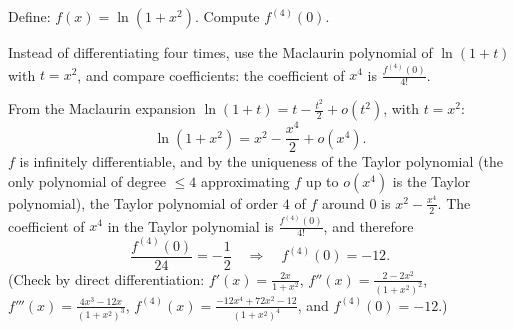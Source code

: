 
\begin{question}
Define: $f(x)=\ln(1+x^2)$. Compute $f^{(4)}(0)$.
\end{question}

\begin{hint}
Instead of differentiating four times, use the Maclaurin polynomial of $\ln(1+t)$ with $t=x^2$, and compare coefficients: the coefficient of $x^4$ is $\frac{f^{(4)}(0)}{4!}$.
\end{hint}

\begin{solution}
From the Maclaurin expansion $\ln(1+t)=t-\frac{t^2}{2}+o(t^2)$, with $t=x^2$:
\[ \ln(1+x^2)=x^2-\frac{x^4}{2}+o(x^4). \]
$f$ is infinitely differentiable, and by the uniqueness of the Taylor polynomial (the only polynomial of degree $\le4$ approximating $f$ up to $o(x^4)$ is the Taylor polynomial), the Taylor polynomial of order $4$ of $f$ around $0$ is $x^2-\frac{x^4}{2}$. The coefficient of $x^4$ in the Taylor polynomial is $\frac{f^{(4)}(0)}{4!}$, and therefore
\[ \frac{f^{(4)}(0)}{24}=-\frac12\quad\Longrightarrow\quad\boxed{f^{(4)}(0)=-12}. \]
(Check by direct differentiation: $f'(x)=\frac{2x}{1+x^2}$, $f''(x)=\frac{2-2x^2}{(1+x^2)^2}$, $f'''(x)=\frac{4x^3-12x}{(1+x^2)^3}$, $f^{(4)}(x)=\frac{-12x^4+72x^2-12}{(1+x^2)^4}$, and $f^{(4)}(0)=-12$.)
\end{solution}

